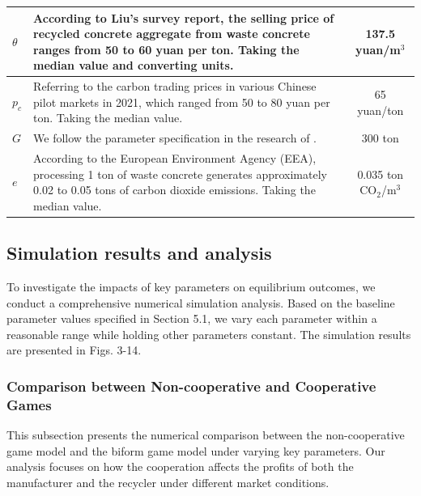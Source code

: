 \documentclass[authoryear,preprint,review,times,10pt]{elsarticle}
\begin{document}
\begin{table}[!htbp]
\begin{tabular}{lp{10cm}c}
\midrule
$\theta$ & According to Liu's survey report, the selling price of recycled concrete aggregate from waste concrete ranges from 50 to 60 yuan per ton. Taking the median value and converting units. & 137.5 yuan/m$^3$ \\
\midrule
$p_c$ & Referring to the carbon trading prices in various Chinese pilot markets in 2021, which ranged from 50 to 80 yuan per ton. Taking the median value. & 65 yuan/ton \\
\midrule
$G$ & We follow the parameter specification in the research of \cite{sun2021Optimal}. & 300 ton \\
\midrule
$e$ & According to the European Environment Agency (EEA), processing 1 ton of waste concrete generates approximately 0.02 to 0.05 tons of carbon dioxide emissions. Taking the median value. & 0.035 ton CO$_2$/m$^3$ \\
\bottomrule
\end{tabular}
\end{table}
\vspace{-15pt}

\subsection{Simulation results and analysis}
\label{sec:simulation_analysis}

To investigate the impacts of key parameters on equilibrium outcomes, we conduct a comprehensive numerical simulation analysis. Based on the baseline parameter values specified in Section 5.1, we vary each parameter within a reasonable range while holding other parameters constant. The simulation results are presented in Figs. 3-14.

\subsubsection{Comparison between Non-cooperative and Cooperative Games}
\label{sec:comparison}

This subsection presents the numerical comparison between the non-cooperative game model and the biform game model under varying key parameters. Our analysis focuses on how the cooperation affects the profits of both the manufacturer and the recycler under different market conditions.
\end{document}

